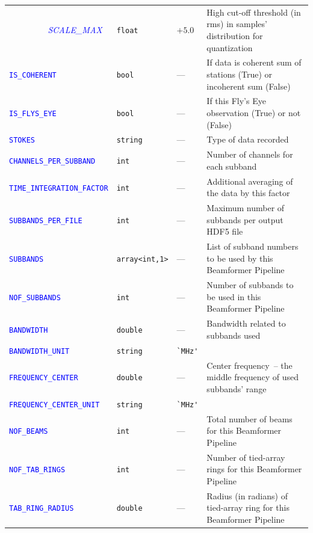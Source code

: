 \documentclass[a4paper,10pt,bibtotoc]{scrartcl}
\begin{document}
\begin{supertabular}{|lllp{5.8cm}|}
  \begin{scriptsize}\textcolor{blue}{\textit{\mbox{~~~~~~~~~}SCALE\_MAX}}\end{scriptsize} & \verb|float| & $+5.0$ & High cut-off threshold (in rms) in samples' distribution for quantization \\
  \textcolor{blue}{\texttt{IS\_COHERENT}}   & \verb|bool| & --- & If data is coherent sum of stations (True) or incoherent sum (False) \\
  \textcolor{blue}{\texttt{IS\_FLYS\_EYE}}   & \verb|bool| & --- & If this Fly's Eye observation (True) or not (False) \\
  \textcolor{blue}{\texttt{STOKES}}        & \verb|string| & --- & Type of data recorded \\
  \textcolor{blue}{\texttt{CHANNELS\_PER\_SUBBAND}} & \verb|int| & --- & Number of channels for each subband \\
  \textcolor{blue}{\texttt{TIME\_INTEGRATION\_FACTOR}} & \verb|int| & --- & Additional averaging of the data by this factor \\
  \textcolor{blue}{\texttt{SUBBANDS\_PER\_FILE}} & \verb|int| & --- & Maximum number of subbands per output HDF5 file \\
  \textcolor{blue}{\texttt{SUBBANDS}} & \verb|array<int,1>| & --- & List of subband numbers to be used by this Beamformer Pipeline \\
  \textcolor{blue}{\texttt{NOF\_SUBBANDS}} & \verb|int| & --- & Number of subbands to be used in this Beamformer Pipeline \\
  \textcolor{blue}{\texttt{BANDWIDTH}} & \verb|double| & --- & Bandwidth related to subbands used \\
  \textcolor{blue}{\texttt{BANDWIDTH\_UNIT}}  & \verb|string| & \verb|`MHz'| &  \\
  \small{\textcolor{blue}{\texttt{FREQUENCY\_CENTER}}}  & \verb|double| & --- & Center frequency~-- the middle frequency of used subbands' range \\
  \small{\textcolor{blue}{\texttt{FREQUENCY\_CENTER\_UNIT}}}  & \verb|string| & \verb|`MHz'| & \\
  \textcolor{blue}{\texttt{NOF\_BEAMS}}  & \verb|int| & --- & Total number of beams for this Beamformer Pipeline \\
  \textcolor{blue}{\texttt{NOF\_TAB\_RINGS}} & \verb|int| & --- & Number of tied-array rings for this Beamformer Pipeline \\
  \textcolor{blue}{\texttt{TAB\_RING\_RADIUS}} & \verb|double| & --- & Radius (in radians) of tied-array ring for this Beamformer Pipeline \\

\end{supertabular}
\end{document}
